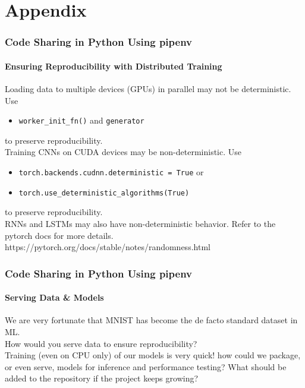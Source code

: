 \documentclass{beamer}
\begin{document}
\section{Appendix}
\begin{frame}
\frametitle{Code Sharing in Python Using pipenv}
\framesubtitle{Ensuring Reproducibility with Distributed Training}
Loading data to multiple devices (GPUs) in parallel may not be deterministic. Use \\
\begin{itemize}
    \item \texttt{worker\_init\_fn()} and \texttt{generator}
\end{itemize}
to preserve reproducibility.\\
\medskip
Training CNNs on CUDA devices may be non-deterministic. Use\\
\begin{itemize}
    \item \texttt{torch.backends.cudnn.deterministic = True} or 
    \item \texttt{torch.use\_deterministic\_algorithms(True)}
\end{itemize}
to preserve reproducibility.\\
\medskip
RNNs and LSTMs may also have non-deterministic behavior. Refer to the pytorch docs for more details.\\
\medskip
\footnotesize
https://pytorch.org/docs/stable/notes/randomness.html
\end{frame}

\begin{frame}
\frametitle{Code Sharing in Python Using pipenv}
\framesubtitle{Serving Data \& Models}
We are very fortunate that MNIST has become the de facto standard dataset in ML.\\
How would you serve data to ensure reproducibility?\\
\medskip
Training (even on CPU only) of our models is very quick! how could we package, or even serve, models for inference and performance testing?
\medskip
What should be added to the repository if the project keeps growing?
\end{frame}
\end{document}
